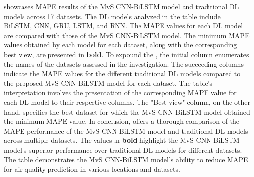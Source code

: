 \documentclass[a4paper, fleqn]{cas-sc}
\theoremstyle{definition}
\theoremstyle{remark}
\begin{document}
 showcases MAPE results of the MvS CNN-BiLSTM model and traditional DL models across 17 datasets. The DL models analyzed in the table include BiLSTM,  CNN,  GRU,  LSTM,  and RNN. The MAPE values for each DL model are compared with those of the MvS CNN-BiLSTM model. The minimum MAPE values obtained by each model for each dataset,  along with the corresponding best view,  are presented in \textbf{bold}. To expound the ,  the initial column enumerates the names of the datasets assessed in the investigation. The succeeding columns indicate the MAPE values for the different traditional DL models compared to the proposed MvS CNN-BiLSTM model for each dataset. The table's interpretation involves the presentation of the corresponding MAPE value for each DL model to their respective columns. The "Best-view" column,  on the other hand,  specifies the best dataset for which the MvS CNN-BiLSTM model obtained the minimum MAPE value. In conclusion,   offers a thorough comparison of the MAPE performance of the MvS CNN-BiLSTM model and traditional DL models across multiple datasets. The values in \textbf{bold} highlight the MvS CNN-BiLSTM model's superior performance over traditional DL models for different datasets. The table demonstrates the MvS CNN-BiLSTM model's ability to reduce MAPE for air quality prediction in various locations and datasets.
\end{document}

